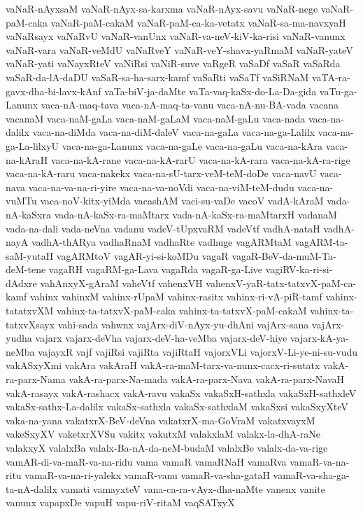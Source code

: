 {vaNaR-nAyxsaM
vaNaR-nAyx-sa-karxma
vaNaR-nAyx-savu
vaNaR-nege
vaNaR-paM-caka
vaNaR-paM-cakaM
vaNaR-paM-ca-ka-vetatx
vaNaR-sa-ma-navxyaH
vaNaRsayx
vaNaRvU
vaNaR-vanUnx
vaNaR-va-neV-kiV-ka-risi
vaNaR-vanunx
vaNaR-vara
vaNaR-veMdU
vaNaRveY
vaNaR-veY-shavx-yaRmaM
vaNaR-yateV
vaNaR-yati
vaNayxRteV
vaNiRsi
vaNiR-suve
vaRgeR
vaSaDf
vaSaR
vaSaRda
vaSaR-da-lA-daDU
vaSaR-sa-ha-sarx-kamf
vaSaRti
vaSaTf
vaSiRNaM
vaTA-ra-gavx-dha-bi-lavx-kAnf
vaTa-biV-ja-daMte
vaTa-vaq-kaSx-do-La-Da-gida
vaTu-ga-Lanunx
vaca-nA-maq-tava
vaca-nA-maq-ta-vanu
vaca-nA-nu-BA-vada
vacana
vacanaM
vaca-naM-gaLa
vaca-naM-gaLaM
vaca-naM-gaLu
vaca-nada
vaca-na-dalilx
vaca-na-diMda
vaca-na-diM-daleV
vaca-na-gaLa
vaca-na-ga-Lalilx
vaca-na-ga-La-lilxyU
vaca-na-ga-Lanunx
vaca-na-gaLe
vaca-na-gaLu
vaca-na-kAra
vaca-na-kAraH
vaca-na-kA-rane
vaca-na-kA-rarU
vaca-na-kA-rara
vaca-na-kA-ra-rige
vaca-na-kA-raru
vaca-nakekx
vaca-na-sU-tarx-veM-teM-doDe
vaca-navU
vaca-nava
vaca-na-va-na-ri-yire
vaca-na-va-noVdi
vaca-na-viM-teM-dudu
vaca-na-vuMTu
vaca-noV-kitx-yiMda
vacashAM
vaci-su-vaDe
vacoV
vadA-kAraM
vada-nA-kaSxra
vada-nA-kaSx-ra-maMtarx
vada-nA-kaSx-ra-maMtarxH
vadanaM
vada-na-dali
vada-neVna
vadanu
vadeV-tUpxvaRM
vadeVtf
vadhA-nataH
vadhA-nayA
vadhA-thARya
vadhaRnaM
vadhaRte
vadhuge
vagARMtaM
vagARM-ta-saM-yutaH
vagARMtoV
vagAR-yi-si-koMDu
vagaR
vagaR-BeV-da-muM-Ta-deM-tene
vagaRH
vagaRM-ga-Lava
vagaRda
vagaR-ga-Live
vagiRV-ka-ri-si-dAdxre
vahAnxyX-gAraM
vaheVtf
vahenxVH
vahenxV-yaR-tatx-tatxvX-paM-ca-kamf
vahinx
vahinxM
vahinx-rUpaM
vahinx-rasitx
vahinx-ri-vA-piR-tamf
vahinx-tatatxvXM
vahinx-ta-tatxvX-paM-caka
vahinx-ta-tatxvX-paM-cakaM
vahinx-ta-tatxvXsayx
vahi-sada
vahwnx
vajArx-diV-nAyx-yu-dhAni
vajArx-sana
vajArx-yudha
vajarx
vajarx-deVha
vajarx-deV-ha-veMba
vajarx-deV-hiye
vajarx-kA-ya-neMba
vajayxR
vajf
vajiRsi
vajiRta
vajiRtaH
vajorxVLi
vajorxV-Li-ye-ni-su-vudu
vakASxyXmi
vakAra
vakAraH
vakA-ra-maM-tarx-va-nunx-cacx-ri-sutatx
vakA-ra-parx-Nama
vakA-ra-parx-Na-mada
vakA-ra-parx-Nava
vakA-ra-parx-NavaH
vakA-rasayx
vakA-rashacx
vakA-ravu
vakaSx
vakaSxH-sathxla
vakaSxH-sathxleV
vakaSx-sathx-La-dalilx
vakaSx-sathxla
vakaSx-sathxlaM
vakaSxsi
vakaSxyXteV
vaka-na-yana
vakatxrX-BeV-deVna
vakatxrX-ma-GoVraM
vakatxvayxM
vakeSxyXV
vaketxrXVSu
vakitx
vakutxM
valakxlaM
valakx-la-dhA-raNe
valakxyX
valalxBa
valalx-Ba-nA-da-neM-budaM
valalxBe
valalx-da-va-rige
vamAR-di-va-maR-va-na-ridu
vama
vamaR
vamaRNaH
vamaRva
vamaR-va-na-ritu
vamaR-va-na-ri-yalekx
vamaR-vanu
vamaR-va-sha-gataH
vamaR-va-sha-ga-ta-nA-dalilx
vamati
vamayxteV
vana-ca-ra-vAyx-dha-naMte
vanenx
vanite
vanunx
vapapxDe
vapuH
vapu-riV-ritaM
vaqSATxyX
}
